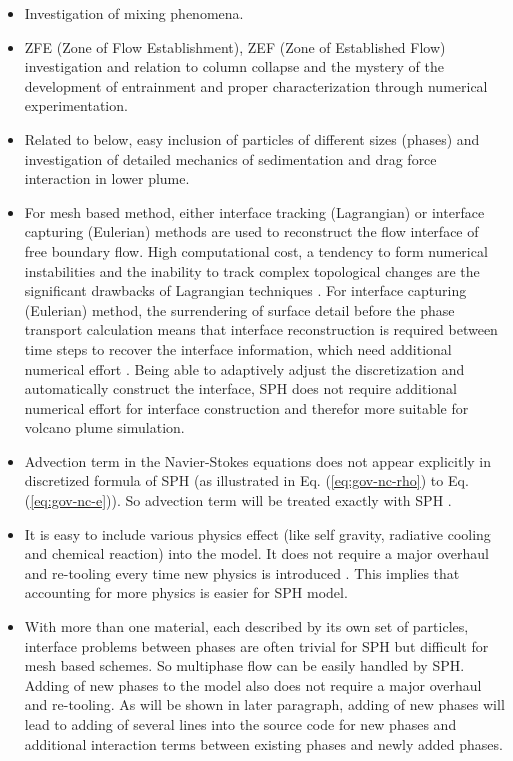 \documentclass[journal abbreviation, manuscript]{copernicus}
\begin{document}
\begin{itemize}
\item Investigation of mixing phenomena. 
\item ZFE (Zone of Flow Establishment), ZEF (Zone of Established Flow) investigation and relation to column collapse and the mystery of the development of entrainment and proper characterization through numerical experimentation.
\item Related to below, easy inclusion of particles of different sizes (phases) and investigation of detailed mechanics of sedimentation and drag force interaction in lower plume.
\item For mesh based method, either interface tracking (Lagrangian) \citep{harlow1965numerical, wrobel1991computational, cheng1995simplified} or interface capturing (Eulerian) \citep{hirt1981volume, youngs1982time, gerlach2006comparison, gopala2008volume} methods are used to reconstruct the flow interface of free boundary flow. High computational cost, a tendency to form numerical instabilities and the inability to track complex topological changes are the significant drawbacks of Lagrangian techniques \citep{hirt1981volume, unverdi1992front, anderson1998diffuse}. For interface capturing (Eulerian) method, the surrendering of surface detail before the phase transport calculation means that interface reconstruction is required between time steps to recover the interface information, which need additional numerical effort \citep{hirt1981volume, youngs1982time}. Being able to adaptively adjust the discretization and automatically construct the interface, SPH does not require additional numerical effort for interface construction and therefor more suitable for volcano plume simulation.
\item Advection term in the Navier-Stokes equations does not appear explicitly in discretized formula of SPH (as illustrated in Eq. (\ref{eq:gov-nc-rho}) to Eq. (\ref{eq:gov-nc-e})). So advection term will be treated exactly with SPH \citep{monaghan2005smoothed}.
\item It is easy to include various physics effect (like self gravity, radiative cooling and chemical reaction) into the model. It does not require a major overhaul and re-tooling every time new physics is introduced \citep{monaghan1995sph}. This implies that accounting for more physics is easier for SPH model.
\item With more than one material, each described by its own set of particles, interface problems between phases are often trivial for SPH but difficult for mesh based schemes. So multiphase flow can be easily handled by SPH. Adding of new phases to the model also does not require a major overhaul and re-tooling. As will be shown in later paragraph, adding of new phases will lead to adding of several lines into the source code for new phases and additional interaction terms between existing phases and newly added phases.
\end{itemize}
\end{document}

